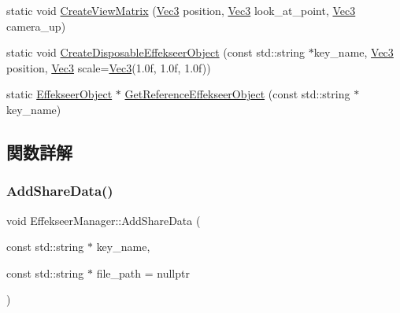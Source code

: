 \begin{DoxyCompactItemize}
\item 
static void \mbox{\hyperlink{class_effekseer_manager_ad36867f996af58d4b788a17cf25244a7}{Create\+View\+Matrix}} (\mbox{\hyperlink{_vector3_d_8h_ab16f59e4393f29a01ec8b9bbbabbe65d}{Vec3}} position, \mbox{\hyperlink{_vector3_d_8h_ab16f59e4393f29a01ec8b9bbbabbe65d}{Vec3}} look\+\_\+at\+\_\+point, \mbox{\hyperlink{_vector3_d_8h_ab16f59e4393f29a01ec8b9bbbabbe65d}{Vec3}} camera\+\_\+up)
\item 
static void \mbox{\hyperlink{class_effekseer_manager_a0b82fe25fbe1dacc0d904fb54267b2fa}{Create\+Disposable\+Effekseer\+Object}} (const std\+::string $\ast$key\+\_\+name, \mbox{\hyperlink{_vector3_d_8h_ab16f59e4393f29a01ec8b9bbbabbe65d}{Vec3}} position, \mbox{\hyperlink{_vector3_d_8h_ab16f59e4393f29a01ec8b9bbbabbe65d}{Vec3}} scale=\mbox{\hyperlink{_vector3_d_8h_ab16f59e4393f29a01ec8b9bbbabbe65d}{Vec3}}(1.\+0f, 1.\+0f, 1.\+0f))
\item 
static \mbox{\hyperlink{class_effekseer_object}{Effekseer\+Object}} $\ast$ \mbox{\hyperlink{class_effekseer_manager_a44878c9abb7f43521c7e8a9700668a28}{Get\+Reference\+Effekseer\+Object}} (const std\+::string $\ast$key\+\_\+name)
\end{DoxyCompactItemize}


\subsection{関数詳解}
\mbox{\label{class_effekseer_manager_aec98cb9052d849cae3f9cfee80c4c873}} 
\subsubsection{\texorpdfstring{Add\+Share\+Data()}{AddShareData()}}
{\footnotesize\ttfamily void Effekseer\+Manager\+::\+Add\+Share\+Data (\begin{DoxyParamCaption}\item[{const std\+::string $\ast$}]{key\+\_\+name,  }\item[{const std\+::string $\ast$}]{file\+\_\+path = {\ttfamily nullptr} }\end{DoxyParamCaption})\hspace{0.3cm}{\ttfamily [static]}}

\mbox{\label{class_effekseer_manager_ad89f0ad2a840f191c088d35ddfd2ec62}} 
